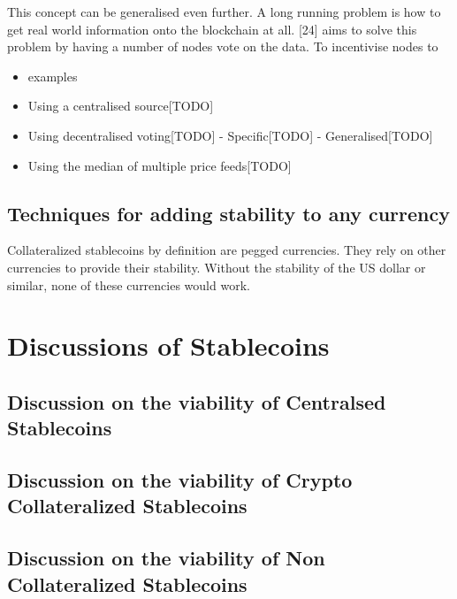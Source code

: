 \documentclass[english,]{IEEEtran}
\begin{document}
This concept can be generalised even further. A long running problem is
how to get real world information onto the blockchain at all. {[}24{]}
aims to solve this problem by having a number of nodes vote on the data.
To incentivise nodes to

\begin{itemize}
\item
  examples
\item
  Using a centralised source{[}TODO{]}
\item
  Using decentralised voting{[}TODO{]} - Specific{[}TODO{]} -
  Generalised{[}TODO{]}
\item
  Using the median of multiple price feeds{[}TODO{]}
\end{itemize}

\subsection{Techniques for adding stability to any
currency}\label{techniques-for-adding-stability-to-any-currency}

Collateralized stablecoins by definition are pegged currencies. They
rely on other currencies to provide their stability. Without the
stability of the US dollar or similar, none of these currencies would
work.

\section{Discussions of Stablecoins}\label{discussions-of-stablecoins}

\subsection{Discussion on the viability of Centralsed
Stablecoins}\label{discussion-on-the-viability-of-centralsed-stablecoins}

\subsection{Discussion on the viability of Crypto Collateralized
Stablecoins}\label{discussion-on-the-viability-of-crypto-collateralized-stablecoins}

\subsection{Discussion on the viability of Non Collateralized
Stablecoins}\label{discussion-on-the-viability-of-non-collateralized-stablecoins}
\end{document}
